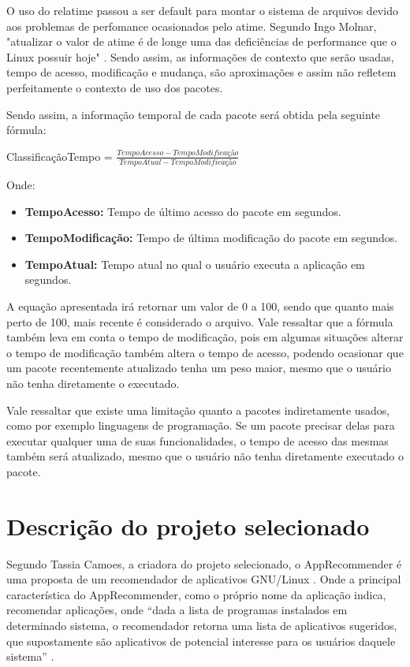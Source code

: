 O uso do relatime passou a ser default para montar o sistema de arquivos devido
aos problemas de perfomance ocasionados pelo atime. Segundo Ingo Molnar, "atualizar o valor
de atime é de longe uma das deficiências de performance que o Linux possuir
hoje" \cite{3_corbet_2007}. Sendo assim, as informações de contexto que serão
usadas, tempo de acesso, modificação e mudança, são aproximações e assim não
refletem perfeitamente o contexto de uso dos pacotes.

Sendo assim, a informação temporal de cada pacote será obtida pela seguinte
fórmula:

ClassificaçãoTempo = $\frac{TempoAcesso - TempoModificação}{TempoAtual -
TempoModificação}$


Onde:

\begin{itemize}
    \item \textbf{TempoAcesso:} Tempo de último acesso do pacote em segundos.
    \item \textbf{TempoModificação:} Tempo de última modificação do pacote em
        segundos.
    \item \textbf{TempoAtual:} Tempo atual no qual o usuário executa a
        aplicação em segundos.
\end{itemize}


A equação apresentada irá retornar um valor de 0 a 100, sendo que quanto mais
perto de 100, mais recente é considerado o arquivo. Vale ressaltar que a fórmula
também leva em conta o tempo de modificação, pois em algumas situações alterar o
tempo de modificação também altera o tempo de acesso, podendo ocasionar que um
pacote recentemente atualizado tenha um peso maior, mesmo que o usuário não
tenha diretamente o executado.

Vale ressaltar que existe uma limitação quanto a pacotes indiretamente usados,
como por exemplo linguagens de programação. Se um pacote precisar delas para
executar qualquer uma de suas funcionalidades, o tempo de acesso das mesmas
também será atualizado, mesmo que o usuário não tenha diretamente executado o
pacote.


\section{Descrição do projeto selecionado}

Segundo Tassia Camoes, a criadora do projeto selecionado, o AppRecommender é uma
proposta de um recomendador de aplicativos GNU/Linux \cite{araujo2011apprecommender}.
Onde a principal característica do AppRecommender, como o próprio nome da aplicação
indica, recomendar aplicações, onde “dada a lista de programas instalados em
determinado sistema, o recomendador retorna uma lista de aplicativos sugeridos, que
supostamente são aplicativos de potencial interesse para os usuários daquele sistema”
\cite{araujo2011apprecommender}.

